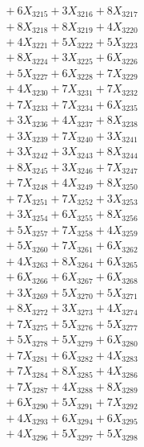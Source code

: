 \documentclass[a4paper,10pt]{article}
\begin{document}
{\begin{align}
&\;  + 6 X_{3215} + 3 X_{3216} + 8 X_{3217} \\[0.3ex]
&\;  + 8 X_{3218} + 8 X_{3219} + 4 X_{3220} \\[0.5ex]\allowbreak
&\;  + 4 X_{3221} + 5 X_{3222} + 5 X_{3223} \\[0.3ex]
&\;  + 8 X_{3224} + 3 X_{3225} + 6 X_{3226} \\[0.3ex]
&\;  + 5 X_{3227} + 6 X_{3228} + 7 X_{3229} \\[0.3ex]
&\;  + 4 X_{3230} + 7 X_{3231} + 7 X_{3232} \\[0.3ex]
&\;  + 7 X_{3233} + 7 X_{3234} + 6 X_{3235} \\[0.3ex]
&\;  + 3 X_{3236} + 4 X_{3237} + 8 X_{3238} \\[0.3ex]
&\;  + 3 X_{3239} + 7 X_{3240} + 3 X_{3241} \\[0.3ex]
&\;  + 3 X_{3242} + 3 X_{3243} + 8 X_{3244} \\[0.3ex]
&\;  + 8 X_{3245} + 3 X_{3246} + 7 X_{3247} \\[0.3ex]
&\;  + 7 X_{3248} + 4 X_{3249} + 8 X_{3250} \\[0.5ex]\allowbreak
&\;  + 7 X_{3251} + 7 X_{3252} + 3 X_{3253} \\[0.3ex]
&\;  + 3 X_{3254} + 6 X_{3255} + 8 X_{3256} \\[0.3ex]
&\;  + 5 X_{3257} + 7 X_{3258} + 4 X_{3259} \\[0.3ex]
&\;  + 5 X_{3260} + 7 X_{3261} + 6 X_{3262} \\[0.3ex]
&\;  + 4 X_{3263} + 8 X_{3264} + 6 X_{3265} \\[0.3ex]
&\;  + 6 X_{3266} + 6 X_{3267} + 6 X_{3268} \\[0.3ex]
&\;  + 3 X_{3269} + 5 X_{3270} + 5 X_{3271} \\[0.3ex]
&\;  + 8 X_{3272} + 3 X_{3273} + 4 X_{3274} \\[0.3ex]
&\;  + 7 X_{3275} + 5 X_{3276} + 5 X_{3277} \\[0.3ex]
&\;  + 5 X_{3278} + 5 X_{3279} + 6 X_{3280} \\[0.5ex]\allowbreak
&\;  + 7 X_{3281} + 6 X_{3282} + 4 X_{3283} \\[0.3ex]
&\;  + 7 X_{3284} + 8 X_{3285} + 4 X_{3286} \\[0.3ex]
&\;  + 7 X_{3287} + 4 X_{3288} + 8 X_{3289} \\[0.3ex]
&\;  + 6 X_{3290} + 5 X_{3291} + 7 X_{3292} \\[0.3ex]
&\;  + 4 X_{3293} + 6 X_{3294} + 6 X_{3295} \\[0.3ex]
&\;  + 4 X_{3296} + 5 X_{3297} + 5 X_{3298} \\[0.3ex]

\end{align}}
\end{document}
